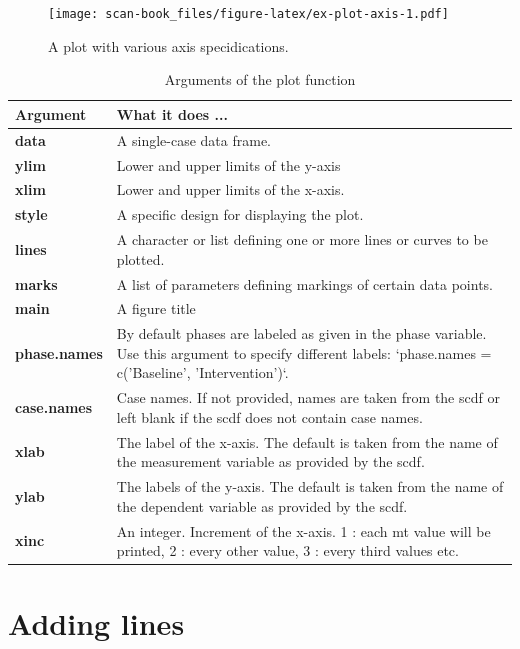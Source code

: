\documentclass[
]{book}
\begin{document}
\begin{figure}
\centering
\texttt{[image: scan-book\_files/figure-latex/ex-plot-axis-1.pdf]}
\caption{\label{fig:ex-plot-axis}A plot with various axis specidications.}
\end{figure}

\begin{table}

\caption{\label{tab:table-plot-arguments}Arguments of the plot function}
\begin{tabular}[t]{>{\raggedright\arraybackslash}p{15em}>{\raggedright\arraybackslash}p{30em}}
\toprule
Argument & What it does ...\\
\midrule
\textbf{data} & A single-case data frame.\\
\textbf{ylim} & Lower and upper limits of the y-axis\\
\textbf{xlim} & Lower and upper limits of the x-axis.\\
\textbf{style} & A specific design for displaying the plot.\\
\textbf{lines} & A character or list defining one or more lines or curves to be plotted.\\
\textbf{marks} & A list of parameters defining markings of certain data points.\\
\textbf{main} & A figure title\\
\textbf{phase.names} & By default phases are labeled as given in the phase variable. Use this argument to specify different labels: `phase.names = c('Baseline', 'Intervention')`.\\
\textbf{case.names} & Case names. If not provided, names are taken from the scdf or left blank if the scdf does not contain case names.\\
\textbf{xlab} & The label of the x-axis. The default is taken from the name of the measurement variable as provided by the scdf.\\
\textbf{ylab} & The labels of the y-axis. The default is taken from the name of the dependent variable as provided by the scdf.\\
\textbf{xinc} & An integer. Increment of the x-axis. 1 : each mt value will be printed, 2 : every other value, 3 : every third values etc.\\
\bottomrule
\end{tabular}
\end{table}

\hypertarget{adding-lines}{%
\section{Adding lines}\label{adding-lines}}
\end{document}
